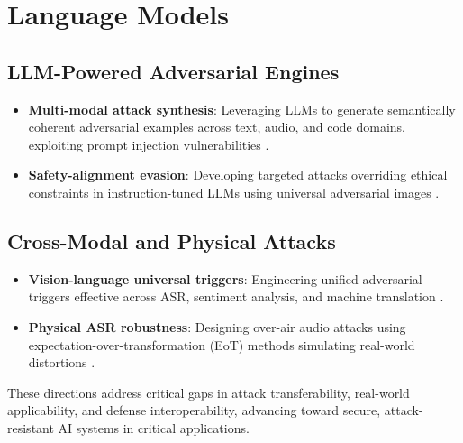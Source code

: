 \documentclass[../main.tex]{subfiles}
\begin{document}
\section{Language Models}

\subsection{LLM-Powered Adversarial Engines}
\begin{itemize}
    \item \textbf{Multi-modal attack synthesis}: Leveraging LLMs to generate semantically coherent adversarial examples across text, audio, and code domains, exploiting prompt injection vulnerabilities \cite{multimodal_attacks}.
    \item \textbf{Safety-alignment evasion}: Developing targeted attacks overriding ethical constraints in instruction-tuned LLMs using universal adversarial images \cite{safety_alignment_evasion}.
\end{itemize}

\subsection{Cross-Modal and Physical Attacks}
\begin{itemize}
    \item \textbf{Vision-language universal triggers}: Engineering unified adversarial triggers effective across ASR, sentiment analysis, and machine translation \cite{over_air_asr}.
    \item \textbf{Physical ASR robustness}: Designing over-air audio attacks using expectation-over-transformation (EoT) methods simulating real-world distortions \cite{eot_methods}.
\end{itemize}



These directions address critical gaps in attack transferability, real-world applicability, and defense interoperability, advancing toward secure, attack-resistant AI systems in critical applications.

\ifsubfiles
    
    
\else
\fi
\end{document}
